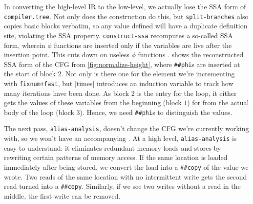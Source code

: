 
In converting the high-level \gls{IR} to the low-level, we actually lose the
\gls{SSA} form of \Verb|compiler.tree|.  Not only does the construction do
this, but \Verb|split-branches| also copies basic blocks verbatim, so any value
defined will have a duplicate definition site, violating the \gls{SSA}
property.  \Verb|construct-ssa| recomputes a so-called  \gls{SSA}
form, wherein $\phi$ functions are inserted only if the variables are live
after the insertion point.  This cuts down on useless $\phi$ functions
\autocites{TDMSC,construct-ssa}.   shows the
reconstructed \gls{SSA} form of the \gls{CFG} from \vref{fig:normalize-height},
where \Verb|##phi|s are inserted at the start of block $2$.  Not only is there
one for the element we're incrementing with \Verb|fixnum+fast|, but
\factor|times| introduces an induction variable to track how many iterations
have been done.  As block $2$ is the entry for the loop, it either gets the
values of these variables from the beginning (block $1$) for from the actual
body of the loop (block $3$).  Hence, we need \Verb|##phi|s to distinguish the
values.


The next pass, \Verb|alias-analysis|, doesn't change the \gls{CFG} we're
currently working with, so we won't have an accompanying
.  At a high level, \Verb|alias-analysis| is easy
to understand: it eliminates redundant memory loads and stores by rewriting
certain patterns of memory access.  If the same location is loaded immediately
after being stored, we convert the load into a \Verb|##copy| of the value we
wrote.  Two reads of the same location with no intermittent write gets the
second read turned into a \Verb|##copy|.  Similarly, if we see two writes
without a read in the middle, the first write can be removed.

